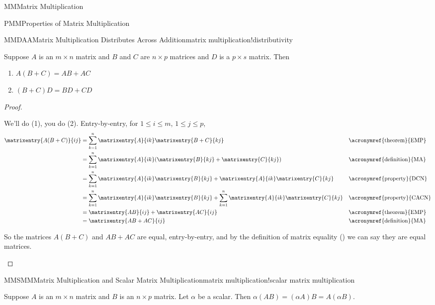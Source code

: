 \begin{subsect}{MM}{Matrix Multiplication}
\begin{subsect}{PMM}{Properties of Matrix Multiplication}
%
\begin{theorem}{MMDAA}{Matrix Multiplication Distributes Across Addition}{matrix multiplication!distributivity}
\begin{para}Suppose $A$ is an $m\times n$ matrix and $B$ and $C$ are $n\times p$ matrices and $D$ is a $p\times s$ matrix.    Then
\begin{enumerate}
\item $A(B+C)=AB+AC$
\item $(B+C)D=BD+CD$
\end{enumerate}
\end{para}
\end{theorem}
%
\begin{proof}
\begin{para}We'll do (1), you do (2).  Entry-by-entry, for $1\leq i\leq m$, $1\leq j\leq p$,
%
\begin{align*}
\matrixentry{A(B+C)}{ij}
&=
\sum_{k=1}^{n}\matrixentry{A}{ik}\matrixentry{B+C}{kj}&&\text{\acronymref{theorem}{EMP}}\\
&=\sum_{k=1}^{n}\matrixentry{A}{ik}(\matrixentry{B}{kj}+\matrixentry{C}{kj})&&\text{\acronymref{definition}{MA}}\\
&=\sum_{k=1}^{n}\matrixentry{A}{ik}\matrixentry{B}{kj}+\matrixentry{A}{ik}\matrixentry{C}{kj}
&&\text{\acronymref{property}{DCN}}\\
&=\sum_{k=1}^{n}\matrixentry{A}{ik}\matrixentry{B}{kj}+\sum_{k=1}^{n}\matrixentry{A}{ik}\matrixentry{C}{kj}&&\text{\acronymref{property}{CACN}}\\
&=\matrixentry{AB}{ij}+\matrixentry{AC}{ij}&&\text{\acronymref{theorem}{EMP}}\\
&=\matrixentry{AB+AC}{ij}&&\text{\acronymref{definition}{MA}}
\end{align*}
\end{para}
%
\begin{para}So the matrices $A(B+C)$ and $AB+AC$ are equal, entry-by-entry, and by the definition of matrix equality () we can say they are equal matrices.\end{para}
%
\end{proof}
%
\begin{theorem}{MMSMM}{Matrix Multiplication and Scalar Matrix Multiplication}{matrix multiplication!scalar matrix multiplication}
\begin{para}Suppose $A$ is an $m\times n$ matrix and $B$ is an $n\times p$ matrix.  Let $\alpha$ be a scalar.  Then $\alpha(AB)=(\alpha A)B=A(\alpha B)$.\end{para}

\end{theorem}
\end{subsect}
\end{subsect}
